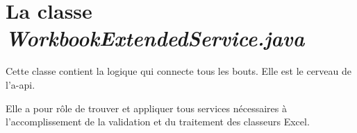 \chapter{La classe \textit{WorkbookExtendedService.java}}
\label{ch:workbook-service-code}

Cette classe contient la logique qui connecte tous les bouts.
Elle est le cerveau de l'\gls{a-api}.

Elle a pour rôle de trouver et appliquer tous services nécessaires à l'accomplissement de la validation et du traitement des classeurs Excel.


